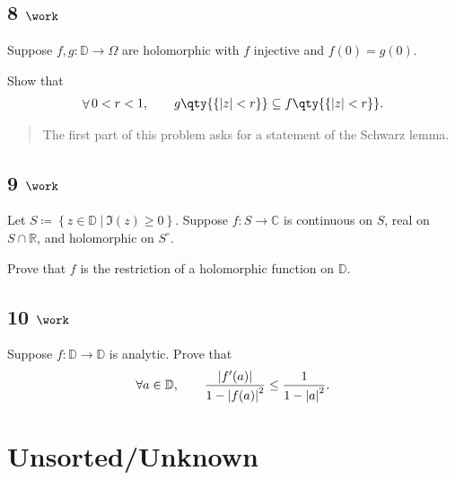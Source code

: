 \hypertarget{work-74}{%
\subsection{\texorpdfstring{8
\(\work\)}{8 \textbackslash work}}\label{work-74}}

Suppose \(f, g: {\mathbb{D}}\to \Omega\) are holomorphic with \(f\)
injective and \(f(0) = g(0)\).

Show that
\begin{align*}  
\mathop{\mathrm{\forall}}0 < r < 1,\qquad g\qty{\left\{{{\left\lvert {z} \right\rvert} < r}\right\}} \subseteq f\qty{\left\{{{\left\lvert {z} \right\rvert} < r}\right\}}
.\end{align*}

\begin{quote}
The first part of this problem asks for a statement of the Schwarz
lemma.
\end{quote}

\hypertarget{work-75}{%
\subsection{\texorpdfstring{9
\(\work\)}{9 \textbackslash work}}\label{work-75}}

Let
\(S\coloneqq\left\{{z\in {\mathbb{D}}{~\mathrel{\Big|}~}\Im(z) \geq 0}\right\}\).
Suppose \(f:S\to {\mathbb{C}}\) is continuous on \(S\), real on
\(S\cap{\mathbb{R}}\), and holomorphic on \(S^\circ\).

Prove that \(f\) is the restriction of a holomorphic function on
\({\mathbb{D}}\).

\hypertarget{work-76}{%
\subsection{\texorpdfstring{10
\(\work\)}{10 \textbackslash work}}\label{work-76}}

Suppose \(f:{\mathbb{D}}\to {\mathbb{D}}\) is analytic. Prove that
\begin{align*}  
\forall a\in {\mathbb{D}}, \qquad {{\left\lvert {f'(a)} \right\rvert} \over 1 - {\left\lvert {f(a)} \right\rvert}^2 } \leq {1 \over 1 - {\left\lvert {a} \right\rvert}^2}
.\end{align*}

\hypertarget{unsortedunknown}{%
\section{Unsorted/Unknown}\label{unsortedunknown}}

